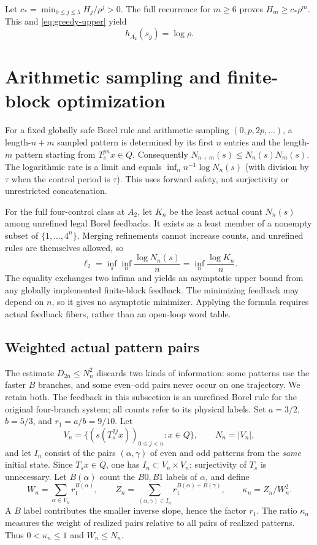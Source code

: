 \documentclass[11pt,reqno]{amsart}
\numberwithin{equation}{section}
\theoremstyle{definition}
\theoremstyle{definition}
\begin{document}
Let $c_* =\min_{0\le j\le5}H_j/\rho^j>0$. The full recurrence
for $m\ge6$ proves $H_m\ge c_*\rho^m$. This and
\eqref{eq:greedy-upper} yield
\begin{equation}\label{eq:greedy-exact}
 h_{A_2}(s_g)=\log\rho.
\end{equation}
\section{Arithmetic sampling and finite-block optimization}
\label{app:finiteblock}
For a fixed globally safe Borel rule and arithmetic sampling
$(0,p,2p,\ldots)$, a length-$n+m$ sampled pattern is determined
by its first $n$ entries and the length-$m$ pattern starting from
$T_s^{pn}x\in Q$. Consequently $N_{n+m}(s)\le N_n(s)N_m(s)$.
The logarithmic rate is a limit and equals
$\inf_n n^{-1}\log N_n(s)$ (with division by $\tau$ when
the control period is $\tau$). This uses forward safety, not
surjectivity or unrestricted concatenation.

For the full four-control class at $A_2$, let $K_n$ be the least
actual count $N_n(s)$ among unrefined legal Borel feedbacks.
It exists as a least member of a nonempty subset of
$\{1,\ldots,4^n\}$. Merging refinements cannot increase counts,
and unrefined rules are themselves allowed, so
\begin{equation}\label{eq:finiteblock}
 \ell_2=\inf_s\inf_n\frac{\log N_n(s)}n
 =\inf_n\frac{\log K_n}n.
\end{equation}
The equality exchanges two infima and yields an asymptotic upper
bound from any globally implemented finite-block feedback. The
minimizing feedback may depend on $n$, so it gives no asymptotic
minimizer. Applying the formula requires actual feedback fibers,
rather than an open-loop word table.


\subsection{Weighted actual pattern pairs}
The estimate $D_{2n}\le N_n^2$ discards two kinds of information:
some patterns use the faster $B$ branches, and some even--odd pairs
never occur on one trajectory. We retain both. The feedback in this
subsection is an unrefined Borel rule for the original four-branch
system; all counts refer to its physical labels.
Set $a=3/2$, $b=5/3$, and $r_1=a/b=9/10$. Let
\[
 V_n=\{(s(T_s^{2j}x))_{0\le j<n}:x\in Q\},\qquad N_n=|V_n|,
\]
and let $I_n$ consist of the pairs $(\alpha,\gamma)$ of even
and odd patterns from the \emph{same} initial state. Since
$T_sx\in Q$, one has $I_n\subset V_n\times V_n$; surjectivity
of $T_s$ is unnecessary. Let $B(\alpha)$ count the $B0,B1$
labels of $\alpha$, and define
\[
 W_n=\sum_{\alpha\in V_n}r_1^{B(\alpha)},\qquad
 Z_n=\sum_{(\alpha,\gamma)\in I_n}
            r_1^{B(\alpha)+B(\gamma)},\qquad
 \kappa_n=Z_n/W_n^2.
\]
A $B$ label contributes the smaller inverse slope, hence the factor
$r_1$. The ratio $\kappa_n$ measures the weight of realized pairs
relative to all pairs of realized patterns. Thus
$0<\kappa_n\le1$ and $W_n\le N_n$.
\end{document}
